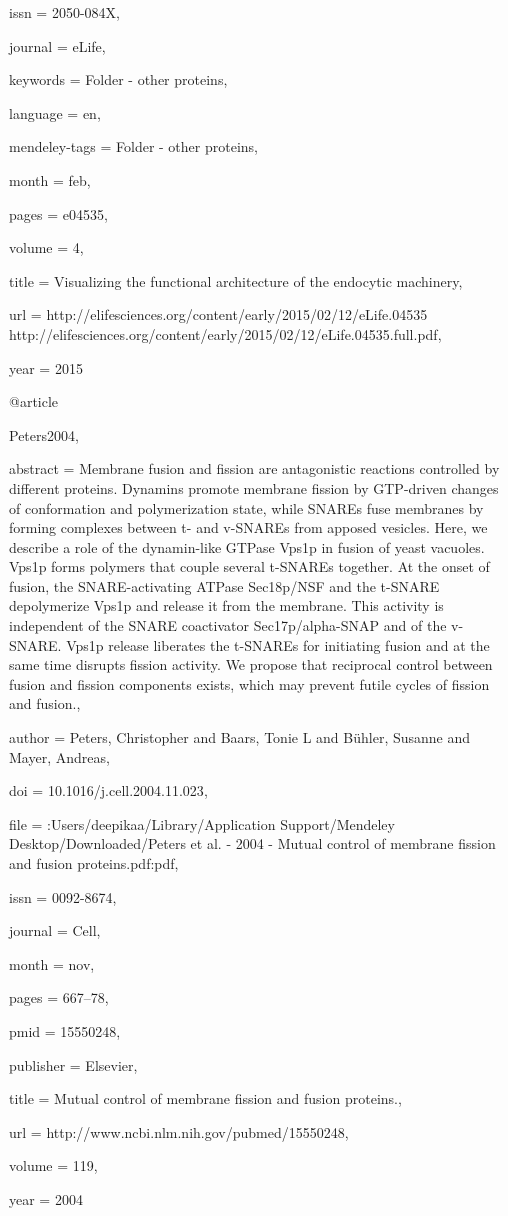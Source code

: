 {issn = {2050-084X},

journal = {eLife},

keywords = {Folder - other proteins},

language = {en},

mendeley-tags = {Folder - other proteins},

month = {feb},

pages = {e04535},

volume = {4},

title = {{Visualizing the functional architecture of the endocytic machinery}},

url = {http://elifesciences.org/content/early/2015/02/12/eLife.04535 http://elifesciences.org/content/early/2015/02/12/eLife.04535.full.pdf},

year = {2015}

}

@article{Peters2004,

abstract = {Membrane fusion and fission are antagonistic reactions controlled by different proteins. Dynamins promote membrane fission by GTP-driven changes of conformation and polymerization state, while SNAREs fuse membranes by forming complexes between t- and v-SNAREs from apposed vesicles. Here, we describe a role of the dynamin-like GTPase Vps1p in fusion of yeast vacuoles. Vps1p forms polymers that couple several t-SNAREs together. At the onset of fusion, the SNARE-activating ATPase Sec18p/NSF and the t-SNARE depolymerize Vps1p and release it from the membrane. This activity is independent of the SNARE coactivator Sec17p/alpha-SNAP and of the v-SNARE. Vps1p release liberates the t-SNAREs for initiating fusion and at the same time disrupts fission activity. We propose that reciprocal control between fusion and fission components exists, which may prevent futile cycles of fission and fusion.},

author = {Peters, Christopher and Baars, Tonie L and B{\"{u}}hler, Susanne and Mayer, Andreas},

doi = {10.1016/j.cell.2004.11.023},

file = {:Users/deepikaa/Library/Application Support/Mendeley Desktop/Downloaded/Peters et al. - 2004 - Mutual control of membrane fission and fusion proteins.pdf:pdf},

issn = {0092-8674},

journal = {Cell},

month = {nov},

pages = {667--78},

pmid = {15550248},

publisher = {Elsevier},

title = {{Mutual control of membrane fission and fusion proteins.}},

url = {http://www.ncbi.nlm.nih.gov/pubmed/15550248},

volume = {119},

year = {2004}

}


